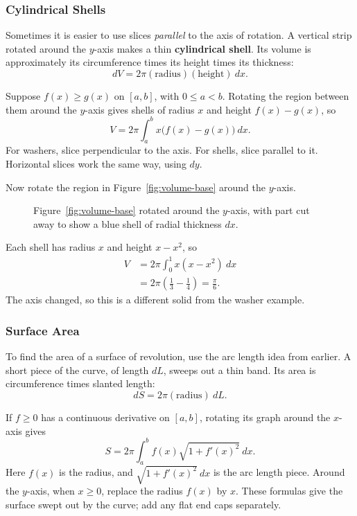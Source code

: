 \subsubsection{Cylindrical Shells}

Sometimes it is easier to use slices \textit{parallel} to the axis of
rotation. A vertical strip rotated around the $y$-axis makes a thin
\textbf{cylindrical shell}. Its volume is approximately its circumference
times its height times its thickness:
$$dV=2\pi(\text{radius})(\text{height})\ dx.$$

Suppose $f(x)\geq g(x)$ on $[a,b]$, with $0\leq a<b$. Rotating the region
between them around the $y$-axis gives shells of radius $x$ and height
$f(x)-g(x)$, so
$$V=2\pi\int_a^b x\bigl(f(x)-g(x)\bigr)\ dx.$$
For washers, slice perpendicular to the axis. For shells, slice parallel
to it. Horizontal slices work the same way, using $dy$.

\begin{exampleblock}[breakable]
Now rotate the region in Figure~\ref{fig:volume-base} around the $y$-axis.
\begin{figure}[H]
\centering

\caption{Figure~\ref{fig:volume-base} rotated around the $y$-axis, with part cut away to show a blue shell of radial thickness $dx$.}
\label{fig:cylindrical-shell}
\end{figure}

Each shell has radius $x$ and height $x-x^2$, so
$$\begin{aligned}
V&=2\pi\int_0^1x(x-x^2)\ dx\\
 &=2\pi\left(\frac13-\frac14\right)=\frac{\pi}{6}.
\end{aligned}$$
The axis changed, so this is a different solid from the washer example.
\end{exampleblock}

\subsubsection{Surface Area}

To find the area of a surface of revolution, use the arc length idea
from earlier. A short piece of the curve, of length $dL$, sweeps out a
thin band. Its area is circumference times slanted length:
$$dS=2\pi(\text{radius})\ dL.$$

If $f\geq0$ has a continuous derivative on $[a,b]$, rotating its graph
around the $x$-axis gives
$$S=2\pi\int_a^b f(x)\sqrt{1+f'(x)^2}\ dx.$$
Here $f(x)$ is the radius, and $\sqrt{1+f'(x)^2}\ dx$ is the arc length
piece. Around the $y$-axis, when $x\geq0$, replace the radius $f(x)$ by
$x$. These formulas give the surface swept out by the curve; add any
flat end caps separately.

